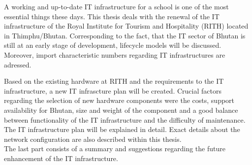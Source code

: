 A working and up-to-date IT infrastructure for a school is one of the most essential things these days. This thesis deals with the renewal of the IT infrastructure of the Royal Institute for Tourism and Hospitality (RITH) located in Thimphu/Bhutan. Corresponding to the fact, that the IT sector of Bhutan is still at an early stage of development, lifecycle models will be discussed. Moreover, import characteristic numbers regarding IT infrastructures are adressed. 

Based on the existing hardware at RITH and the requirements to the IT infrastructure, a new IT infrascture plan will be created. Crucial factors regarding the selection of new hardware components were the costs, support availability for Bhutan, size and weight of the component and a good balance between functionality of the IT infrastructure and the difficulty of maintenance. The IT infrastructure plan will be explained in detail. Exact details about the network configuration are also described within this thesis. \\
The last part consists of a summary and suggestions regarding the future enhancement of the IT infrastructure. 